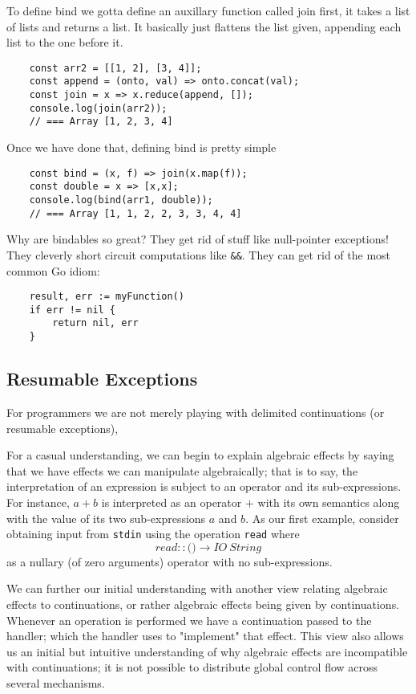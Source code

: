 To define bind we gotta define an auxillary function called join first,
it takes a list of lists and returns a list.
It basically just flattens the list given,
appending each list to the one before it.

\begin{verbatim}
    const arr2 = [[1, 2], [3, 4]];
    const append = (onto, val) => onto.concat(val);
    const join = x => x.reduce(append, []);
    console.log(join(arr2));
    // === Array [1, 2, 3, 4]
\end{verbatim}
Once we have done that, defining bind is pretty simple
\begin{verbatim}
    const bind = (x, f) => join(x.map(f));
    const double = x => [x,x];
    console.log(bind(arr1, double));
    // === Array [1, 1, 2, 2, 3, 3, 4, 4]
\end{verbatim}

Why are bindables so great?
They get rid of stuff like null-pointer exceptions!
They cleverly short circuit computations like \texttt{\&\&}.
They can get rid of the most common Go idiom:
\begin{verbatim}
    result, err := myFunction()
    if err != nil {
        return nil, err
    }
\end{verbatim}

\subsection{Resumable Exceptions}
For programmers
we are not merely playing with delimited continuations (or resumable exceptions),

For a casual understanding,
we can begin to explain algebraic effects by saying that
we have effects we can manipulate algebraically; that is to say,
the interpretation of an expression is
subject to an operator and its sub-expressions.
For instance, $a + b$ is interpreted as an operator
$+$ with its own semantics along with the value of its
two sub-expressions $a$ and $b$.
As our first example, consider obtaining input from
\texttt{stdin} using the operation \texttt{read} where
\begin{equation}
    read :: \texttt{()} \rightarrow IO\ String
\end{equation}
as a nullary (of zero arguments) operator with no sub-expressions.

We can further our initial understanding with another view
relating algebraic effects to continuations,
or rather algebraic effects being given by continuations.
Whenever an operation is performed we have a continuation
passed to the handler;
which the handler uses to "implement" that effect.
This view also allows us an initial but intuitive
understanding of why algebraic effects are incompatible with continuations;
it is not possible to distribute global control flow across several mechanisms.


